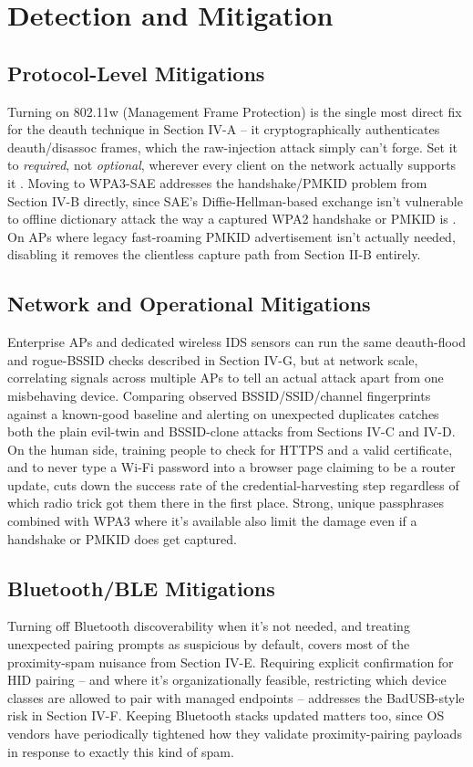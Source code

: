 \documentclass[conference]{IEEEtran}
\begin{document}
\section{Detection and Mitigation}

\subsection{Protocol-Level Mitigations}
Turning on 802.11w (Management Frame Protection) is the single most direct fix for the deauth technique in Section IV-A -- it cryptographically authenticates deauth/disassoc frames, which the raw-injection attack simply can't forge. Set it to \emph{required}, not \emph{optional}, wherever every client on the network actually supports it \cite{wpa3spec}. Moving to WPA3-SAE addresses the handshake/PMKID problem from Section IV-B directly, since SAE's Diffie-Hellman-based exchange isn't vulnerable to offline dictionary attack the way a captured WPA2 handshake or PMKID is \cite{wpa3spec}. On APs where legacy fast-roaming PMKID advertisement isn't actually needed, disabling it removes the clientless capture path from Section II-B entirely.

\subsection{Network and Operational Mitigations}
Enterprise APs and dedicated wireless IDS sensors can run the same deauth-flood and rogue-BSSID checks described in Section IV-G, but at network scale, correlating signals across multiple APs to tell an actual attack apart from one misbehaving device. Comparing observed BSSID/SSID/channel fingerprints against a known-good baseline and alerting on unexpected duplicates catches both the plain evil-twin and BSSID-clone attacks from Sections IV-C and IV-D. On the human side, training people to check for HTTPS and a valid certificate, and to never type a Wi-Fi password into a browser page claiming to be a router update, cuts down the success rate of the credential-harvesting step regardless of which radio trick got them there in the first place. Strong, unique passphrases combined with WPA3 where it's available also limit the damage even if a handshake or PMKID does get captured.

\subsection{Bluetooth/BLE Mitigations}
Turning off Bluetooth discoverability when it's not needed, and treating unexpected pairing prompts as suspicious by default, covers most of the proximity-spam nuisance from Section IV-E. Requiring explicit confirmation for HID pairing -- and where it's organizationally feasible, restricting which device classes are allowed to pair with managed endpoints -- addresses the BadUSB-style risk in Section IV-F. Keeping Bluetooth stacks updated matters too, since OS vendors have periodically tightened how they validate proximity-pairing payloads in response to exactly this kind of spam.
\end{document}
